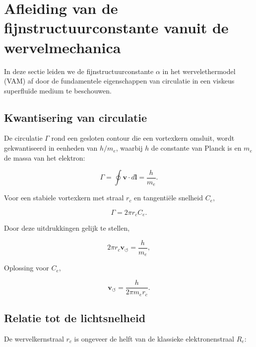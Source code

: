 
\section{Afleiding van de fijnstructuurconstante vanuit de wervelmechanica}
\label{sec:appendix-alpha}

In deze sectie leiden we de fijnstructuurconstante $\alpha$ in het wervelethermodel (VAM) af door de fundamentele eigenschappen van circulatie in een viskeus superfluïde medium te beschouwen.

\subsection{Kwantisering van circulatie}

De circulatie $\Gamma$ rond een gesloten contour die een vortexkern omsluit, wordt gekwantiseerd in eenheden van $h/m_e$, waarbij $h$ de constante van Planck is en $m_e$ de massa van het elektron:

\begin{equation}
\Gamma = \oint \mathbf{v} \cdot d\mathbf{l} = \frac{h}{m_e}.
\end{equation}

Voor een stabiele vortexkern met straal $r_c$ en tangentiële snelheid $C_e$,

\begin{equation}
\Gamma = 2 \pi r_c C_e.
\end{equation}

Door deze uitdrukkingen gelijk te stellen,

\begin{equation}
2 \pi r_c \mathbf{v}_{\scriptscriptstyle\boldsymbol{\circlearrowleft}} = \frac{h}{m_e},
\end{equation}

Oplossing voor $C_e$,

\begin{equation}
\mathbf{v}_{\scriptscriptstyle\boldsymbol{\circlearrowleft}} = \frac{h}{2 \pi m_e r_c}.
\end{equation}

\subsection{Relatie tot de lichtsnelheid}

De wervelkernstraal $r_c$ is ongeveer de helft van de klassieke elektronenstraal $R_e$:

